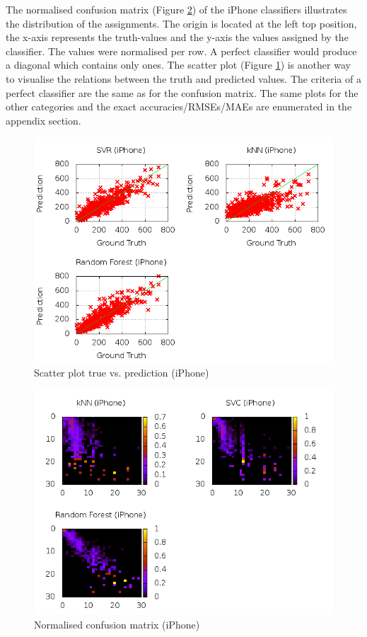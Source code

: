 The normalised confusion matrix (Figure \ref{conf_mat_iphone}) of the iPhone classifiers illustrates the distribution of the assignments. The origin is located at the left top position, the x-axis represents the truth-values and the y-axis the values assigned by the classifier. The values were normalised per row. A perfect classifier would produce a diagonal which contains only ones. 
The scatter plot (Figure \ref{true_predict_iphone}) is another way to visualise the relations between the truth and predicted values. The criteria of a perfect classifier are the same as for the confusion matrix. 
The same plots for the other categories and the exact accuracies/RMSEs/MAEs are enumerated in the appendix section.
\begin{figure}
\centering
\includegraphics[scale=0.55]{images/plots/machine_learning/iphone/true_pred_iphone.png}
\caption{Scatter plot true vs. prediction (iPhone)}
\label{true_predict_iphone}
\end{figure}
\begin{figure}
\centering
\includegraphics[scale=0.55]{images/plots/machine_learning/iphone/conf_mat_iphone.png}
\caption{Normalised confusion matrix (iPhone)}
\label{conf_mat_iphone}
\end{figure}


